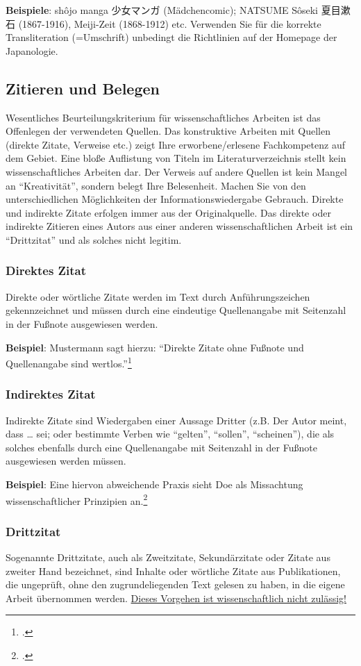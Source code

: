 \documentclass{japo}
\begin{document}
\textbf{Beispiele}: shôjo manga 少女マンガ (Mädchencomic); NATSUME Sôseki 夏目漱石 (1867-1916), Meiji-Zeit (1868-1912) etc. Verwenden Sie für die korrekte Transliteration (=Umschrift) unbedingt die Richtlinien auf der Homepage der Japanologie.

\subsection{Zitieren und Belegen}
Wesentliches Beurteilungskriterium für wissenschaftliches Arbeiten ist das Offenlegen der verwendeten Quellen. Das konstruktive Arbeiten mit Quellen (direkte Zitate, Verweise etc.) zeigt Ihre erworbene/erlesene Fachkompetenz auf dem Gebiet. Eine bloße Auflistung von Titeln im Literaturverzeichnis stellt kein wissenschaftliches Arbeiten dar. Der Verweis auf andere Quellen ist kein Mangel an \enquote{Kreativität}, sondern belegt Ihre Belesenheit. Machen Sie von den unterschiedlichen Möglichkeiten der Informationswiedergabe Gebrauch. Direkte und indirekte Zitate erfolgen immer aus der Originalquelle. Das direkte oder indirekte Zitieren eines Autors aus einer anderen wissenschaftlichen Arbeit ist ein \enquote{Drittzitat} und als solches nicht legitim.

\subsubsection{Direktes Zitat}
Direkte oder wörtliche Zitate werden im Text durch Anführungszeichen gekennzeichnet und müssen durch eine eindeutige Quellenangabe mit Seitenzahl in der Fußnote ausgewiesen werden.

\textbf{Beispiel}: Mustermann sagt hierzu: \enquote{Direkte Zitate ohne Fußnote und Quellenangabe sind wertlos.}\footcite[12]{muster:quellen}

\subsubsection{Indirektes Zitat}
Indirekte Zitate sind Wiedergaben einer Aussage Dritter (z.B. Der Autor meint, dass … sei; oder bestimmte Verben wie \enquote{gelten}, \enquote{sollen}, \enquote{scheinen}), die als solches ebenfalls durch eine Quellenangabe mit Seitenzahl in der Fußnote ausgewiesen werden müssen.

\textbf{Beispiel}: Eine hiervon abweichende Praxis sieht Doe als Missachtung wissenschaftlicher Prinzipien an.\footcite[13\psq]{doe:references}

\subsubsection{Drittzitat}
Sogenannte Drittzitate, auch als Zweitzitate, Sekundärzitate oder Zitate aus zweiter Hand bezeichnet, sind Inhalte oder wörtliche Zitate aus Publikationen, die ungeprüft, ohne den zugrundeliegenden Text gelesen zu haben, in die eigene Arbeit übernommen werden. \underline{Dieses Vorgehen ist wissenschaftlich nicht zulässig!}
\end{document}

